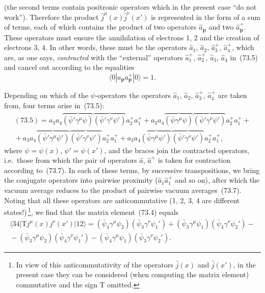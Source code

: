 (the second terms contain positronic operators which in the present case ``do not work''). Therefore the product $\hat{j}^\mu(x)\hat{j}^\nu(x')$ is represented in the form of a sum of terms, each of which contains the product of two operators $\hat{a}_\mathbf{p}$ and two $\hat{a}_\mathbf{p}^+$. These operators must ensure the annihilation of electrons 1, 2 and the creation of electrons 3, 4. In other words, these must be the operators $\hat{a}_1$, $\hat{a}_2$, $\hat{a}_3^+$, $\hat{a}_4^+$, which are, as one says, \textit{contracted} with the ``external'' operators $\hat{a}_1^+$, $\hat{a}_2^+$, $\hat{a}_3$, $\hat{a}_4$ in~(73.5) and cancel out according to the equalities
\begin{equation}
\langle 0|a_\mathbf{p} a_\mathbf{p}^+|0\rangle = 1.
\tag{73.7}
\end{equation}

Depending on which of the $\psi$-operators the operators $\hat{a}_1$, $\hat{a}_2$, $\hat{a}_3^+$, $\hat{a}_4^+$ are taken from, four terms arise in~(73.5):
\begin{equation}
\begin{split}
(73.5) = a_3 a_4 \overbrace{(\bar{\psi}'\gamma^\mu\psi)} \overbrace{(\bar{\psi}'\gamma^\nu\psi')} a_2^+ a_1^+ +
a_3 a_4 \overbrace{(\bar{\psi}\gamma^\mu\psi)} \overbrace{(\bar{\psi}'\gamma^\nu\psi')} a_2^+ a_1^+ +{}\\
{}+ a_3 a_4 \overbrace{(\bar{\psi}'\gamma^\mu\psi')} \overbrace{(\bar{\psi}'\gamma^\nu\psi')} a_2^+ a_1^+ +
a_3 a_4 \overbrace{(\bar{\psi}\gamma^\mu\psi')} \overbrace{(\bar{\psi}'\gamma^\nu\psi')} a_2^+ a_1^+,
\end{split}
\tag{73.8}
\end{equation}
where $\psi = \psi(x)$, $\psi' = \psi(x')$, and the braces join the contracted operators, i.e.\ those from which the pair of operators $\hat{a}$, $\hat{a}^+$ is taken for contraction according to~(73.7). In each of these terms, by successive transpositions, we bring the conjugate operators into pairwise proximity ($\hat{a}_1\hat{a}_1^+$ and so on), after which the vacuum average reduces to the product of pairwise vacuum averages~(73.7). Noting that all these operators are anticommutative (1, 2, 3, 4 are different states!)\,\footnote{In view of this anticommutativity of the operators $\hat{j}(x)$ and $\hat{j}(x')$, in the present case they can be considered (when computing the matrix element) commutative and the sign T omitted.}, we find that the matrix element~(73.4) equals
\begin{equation}
\begin{split}
\langle 34|\mathrm{T}j^\mu(x)j^\nu(x')|12\rangle = (\bar{\psi}_4\gamma^\mu\psi_2)(\bar{\psi}_3\gamma^\nu\psi_1') + (\bar{\psi}_3\gamma^\mu\psi_1)(\bar{\psi}_4\gamma^\nu\psi_2') -{}\\
{}- (\bar{\psi}_3\gamma^\mu\psi_2)(\bar{\psi}_4\gamma^\nu\psi_1') - (\bar{\psi}_4\gamma^\mu\psi_1)(\bar{\psi}_3\gamma^\nu\psi_2').
\end{split}
\tag{73.9}
\end{equation}

